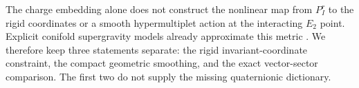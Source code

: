 The charge embedding alone does not construct the nonlinear map
from $P_I^r$ to the rigid coordinates or a smooth hypermultiplet
action at the interacting $E_2$ point. Explicit conifold
supergravity models already approximate this metric
\cite{Mohaupt:2004de}. We therefore keep three statements separate:
the rigid invariant-coordinate constraint, the compact geometric
smoothing, and the exact vector-sector comparison. The first two
do not supply the missing quaternionic dictionary.
